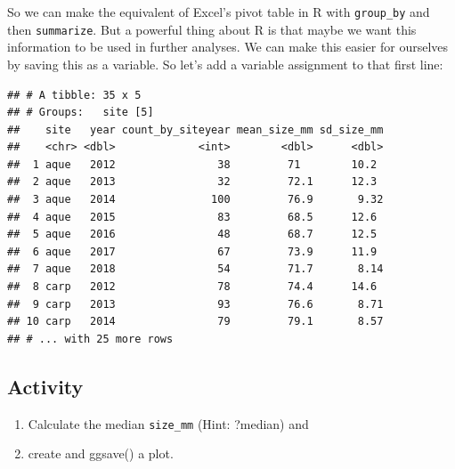 \documentclass[]{book}
\newenvironment{Shaded}{\begin{snugshade}}{\end{snugshade}}
\newcommand{\DataTypeTok}[1]{\textcolor[rgb]{0.13,0.29,0.53}{#1}}
\newcommand{\KeywordTok}[1]{\textcolor[rgb]{0.13,0.29,0.53}{\textbf{#1}}}
\newcommand{\NormalTok}[1]{#1}
\newcommand{\OperatorTok}[1]{\textcolor[rgb]{0.81,0.36,0.00}{\textbf{#1}}}
\newcommand{\OtherTok}[1]{\textcolor[rgb]{0.56,0.35,0.01}{#1}}
\newcommand{\StringTok}[1]{\textcolor[rgb]{0.31,0.60,0.02}{#1}}
\providecommand{\tightlist}{%
  \setlength{\itemsep}{0pt}\setlength{\parskip}{0pt}}
\begin{document}
So we can make the equivalent of Excel's pivot table in R with \texttt{group\_by} and then \texttt{summarize}. But a powerful thing about R is that maybe we want this information to be used in further analyses. We can make this easier for ourselves by saving this as a variable. So let's add a variable assignment to that first line:

\begin{Shaded}
\end{Shaded}

\begin{verbatim}
## # A tibble: 35 x 5
## # Groups:   site [5]
##    site   year count_by_siteyear mean_size_mm sd_size_mm
##    <chr> <dbl>             <int>        <dbl>      <dbl>
##  1 aque   2012                38         71        10.2 
##  2 aque   2013                32         72.1      12.3 
##  3 aque   2014               100         76.9       9.32
##  4 aque   2015                83         68.5      12.6 
##  5 aque   2016                48         68.7      12.5 
##  6 aque   2017                67         73.9      11.9 
##  7 aque   2018                54         71.7       8.14
##  8 carp   2012                78         74.4      14.6 
##  9 carp   2013                93         76.6       8.71
## 10 carp   2014                79         79.1       8.57
## # ... with 25 more rows
\end{verbatim}

\hypertarget{activity-3}{%
\subsection{Activity}\label{activity-3}}

\begin{enumerate}
\def\labelenumi{\arabic{enumi}.}
\tightlist
\item
  Calculate the median \texttt{size\_mm} (Hint: ?median) and
\item
  create and ggsave() a plot.
\end{enumerate}
\end{document}
